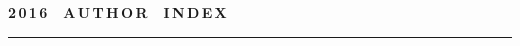 

\def\stat{cont-e}
{%
\raggedleft\Large \bf%
2\,0\,1\,6\ \ A\,U\,T\,H\,O\,R\ \ I\,N\,D\,E\,X \vskip 17pt
 \hrule
 \par
{} }

\label{st\stat}

\def\tit{\ }

\def\aut{\ }
\def\auf{\ }

\def\leftkol{\ } %

\def\rightkol{\ } %

\titele{\tit}{\aut}{\auf}{\leftkol}{\rightkol}

\def\leftfootline{\small{\textbf{\thepage}
\hfill INFORMATIKA I EE PRIMENENIYA~--- INFORMATICS AND APPLICATIONS\ \ \ 2016\
\ \ volume~10\ \ \ issue\ 4}
}%
 \def\rightfootline{\small{INFORMATIKA I EE PRIMENENIYA~--- INFORMATICS AND APPLICATIONS\ \ \ 2016\ \ \ volume~10\ \ \ issue\ 4
\hfill \textbf{\thepage}}}

\vspace*{-12pt}
\vspace*{-18pt}

